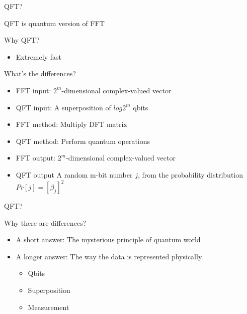 \begin{frame}{QFT?}

\begin{block}{QFT is quantum version of FFT}

\end{block}

\begin{block}{Why QFT?}

\begin{itemize}
\itemsep1pt\parskip0pt
\item
  Extremely fast
\end{itemize}

\end{block}

\begin{block}{What's the differences?}

\begin{itemize}
\item
  FFT input: $2^{m}$-dimensional complex-valued vector
\item
  QFT input: A superposition of $log2^{m}$ qbits
\item
  FFT method: Multiply DFT matrix
\item
  QFT method: Perform quantum operations
\item
  FFT output: $2^{m}$-dimensional complex-valued vector
\item
  QFT output A random m-bit number $j$, from the probability
  distribution $Pr\left[j\right]=\left[\beta_{j}\right]^{2}$
\end{itemize}

\end{block}

\end{frame}

\begin{frame}{QFT?}

\begin{block}{Why there are differences?}

\begin{itemize}
\item
  A short answer: The mysterious principle of quantum world
\item
  A longer answer: The way the data is represented physically

  \begin{itemize}
  \itemsep1pt\parskip0pt
  \item
    Qbits
  \item
    Superposition
  \item
    Measurement
  \end{itemize}
\end{itemize}

\end{block}

\end{frame}

